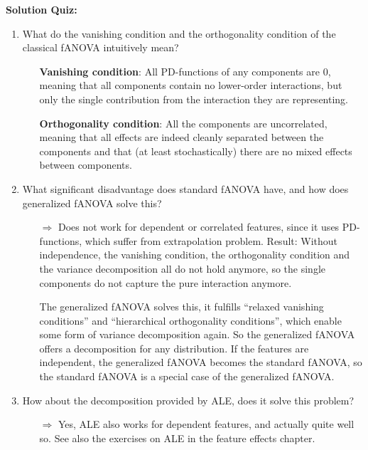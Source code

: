 \textbf{Solution Quiz:}\\\noindent
\medskip

\begin{enumerate}
    
    \item 
    What do the vanishing condition and the orthogonality condition of the classical fANOVA intuitively mean?
    
    \begin{itemize}
    
        \item[\textbf{Vanishing condition}:] All PD-functions of any components are 0, meaning that all components contain no lower-order interactions, but only the single contribution from the interaction they are representing.
    
        \item[\textbf{Orthogonality condition}:] All the components are uncorrelated, meaning that all effects are indeed cleanly separated between the components and that (at least stochastically) there are no mixed effects between components.
    
    \end{itemize}
    
    \item
    What significant disadvantage does standard fANOVA have, and how does generalized fANOVA solve this?
    \begin{itemize}
        \item[$\Rightarrow$]
        Does not work for dependent or correlated features, since it uses PD-functions, which suffer from extrapolation problem.
        Result: Without independence, the vanishing condition, the orthogonality condition and the variance decomposition all do not hold anymore, so the single components do not capture the pure interaction anymore.
        
        The generalized fANOVA solves this, it fulfills ``relaxed vanishing conditions'' and ``hierarchical orthogonality conditions'', which enable some form of variance decomposition again.
        So the generalized fANOVA offers a decomposition for any distribution.
        If the features are independent, the generalized fANOVA becomes the standard fANOVA, so the standard fANOVA is a special case of the generalized fANOVA.
    \end{itemize}
    
    \item
    How about the decomposition provided by ALE, does it solve this problem?
    \begin{itemize}
        \item[$\Rightarrow$]
        Yes, ALE also works for dependent features, and actually quite well so.
        See also the exercises on ALE in the feature effects chapter.
    \end{itemize}
    

\end{enumerate}

